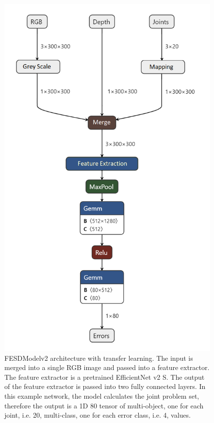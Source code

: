 \begin{figure}[h]
  \centering
  \includegraphics[width=\linewidth]{figures/Model/FESDv2.png}
  \caption[FESDModel architecture version 2]{FESDModelv2 architecture with transfer learning. The input is merged into a single RGB image and passed into a feature extractor. The feature extractor is a pretrained EfficientNet v2 S. The output of the feature extractor is passed into two fully connected layers. In this example network, the model calculates the joint problem set, therefore the output is a 1D 80 tensor of multi-object, one for each joint, i.e. 20, multi-class, one for each error class, i.e. 4, values.}
  \label{fig:model_architecture_v2}
\end{figure}

